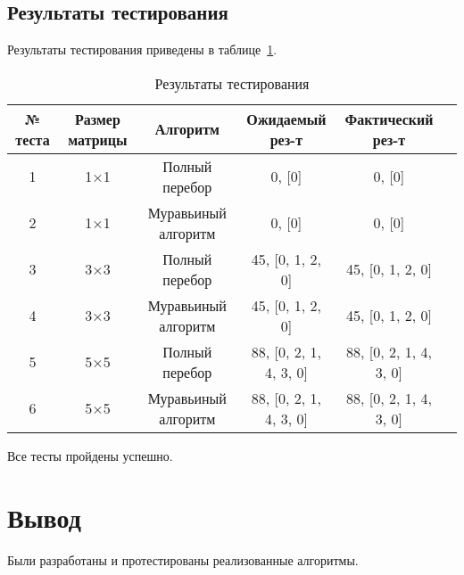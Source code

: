 \subsection*{Результаты тестирования}

Результаты тестирования приведены в таблице~\ref{tab:results}.


\begin{longtable}{|c|c|c|c|c|p{4cm}|}
\caption{Результаты тестирования\label{tab:results}} \\ \hline
\textbf{№ теста} & \textbf{Размер матрицы} & \textbf{Алгоритм} & \textbf{Ожидаемый рез-т} & \textbf{Фактический рез-т} \\ \hline
1 & 1×1 & Полный перебор & 0, [0] & 0, [0]  \\ \hline
2 & 1×1 & Муравьиный алгоритм & 0, [0] & 0, [0]  \\ \hline
3 & 3×3 & Полный перебор & 45, [0, 1, 2, 0] & 45, [0, 1, 2, 0] \\ \hline
4 & 3×3 & Муравьиный алгоритм & 45, [0, 1, 2, 0] & 45, [0, 1, 2, 0] \\ \hline
5 & 5×5 & Полный перебор & 88, [0, 2, 1, 4, 3, 0] & 88, [0, 2, 1, 4, 3, 0] \\ \hline
6 & 5×5 & Муравьиный алгоритм & 88, [0, 2, 1, 4, 3, 0] & 88, [0, 2, 1, 4, 3, 0] \\ \hline
\end{longtable}

Все тесты пройдены успешно.

\section*{Вывод}

Были разработаны и протестированы реализованные алгоритмы.


